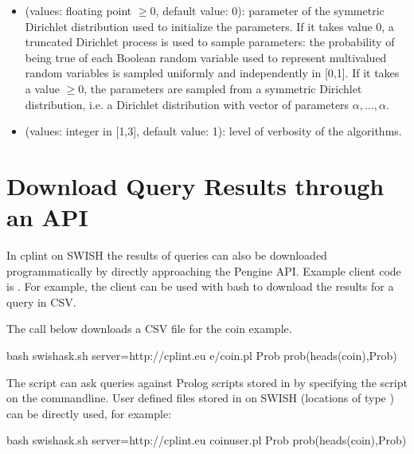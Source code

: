 \documentclass[letterpaper,10pt,english]{sphinxmanual}
\begin{document}
\begin{itemize}
\item {} 
 (values: floating point \(\geq 0\), default value: 0): parameter of the symmetric Dirichlet distribution used to initialize the parameters. If it takes value 0, a truncated Dirichlet process is used to sample parameters: the probability of being true of each Boolean random variable used to represent multivalued random variables is sampled uniformly and independently in {[}0,1{]}. If it takes a value \(\geq 0\), the parameters are sampled from a symmetric Dirichlet distribution, i.e. a Dirichlet distribution with vector of parameters \(\alpha,\ldots,\alpha\).

\item {} 
 (values: integer in {[}1,3{]}, default value: 1): level of verbosity of the algorithms.

\end{itemize}


\chapter{Download Query Results through an API}
\label{\detokenize{index:download-query-results-through-an-api}}
In cplint on SWISH the results of queries can also be downloaded programmatically by directly approaching the Pengine API.
Example client code is .
For example, the  client can be used with bash to download the results for a query in CSV.

The call below downloads a CSV file for the coin example.

\begin{sphinxVerbatim}[commandchars=\\\{\}]
\PYGZdl{} bash swish\PYGZhy{}ask.sh \PYGZhy{}\PYGZhy{}server=http://cplint.eu e/coin.pl Prob \PYGZdq{}prob(heads(coin),Prob)\PYGZdq{}
\end{sphinxVerbatim}

The script can ask queries against Prolog scripts stored in  by specifying the script on the commandline.
User defined files stored in  on SWISH (locations of type ) can be directly used, for example:

\begin{sphinxVerbatim}[commandchars=\\\{\}]
\PYGZdl{} bash swish\PYGZhy{}ask.sh \PYGZhy{}\PYGZhy{}server=http://cplint.eu coin\PYGZus{}user.pl Prob \PYGZdq{}prob(heads(coin),Prob)\PYGZdq{}
\end{sphinxVerbatim}
\end{document}
